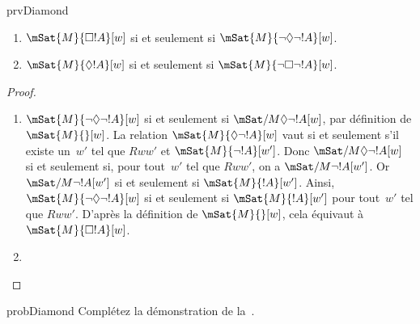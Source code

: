 \documentclass[../../../include/open-logic-section]{subfiles}
\begin{document}
\begin{tagblock}{prvDiamond}
\begin{prop}
  \begin{enumerate}
  \item $\mSat{M}{\Box !A}[w]$ si et seulement si
    $\mSat{M}{\lnot\Diamond\lnot !A}[w]$.
  \item $\mSat{M}{\Diamond !A}[w]$ si et seulement si
    $\mSat{M}{\lnot\Box\lnot !A}[w]$.
  \end{enumerate}
\end{prop}

\begin{proof}
  \begin{enumerate}
    \item $\mSat{M}{\lnot\Diamond\lnot !A}[w]$ si et seulement si
      $\mSat/{M}{\Diamond\lnot !A}[w]$, par définition de
      $\mSat{M}{}[w]$. La relation
      $\mSat{M}{\Diamond\lnot !A}[w]$ vaut si et seulement s'il
      existe un~$w'$ tel que $Rww'$ et
      $\mSat{M}{\lnot !A}[w']$. Donc
      $\mSat/{M}{\Diamond\lnot !A}[w]$ si et seulement si, pour
      tout~$w'$ tel que $Rww'$, on a
      $\mSat/{M}{\lnot !A}[w']$. Or
      $\mSat/{M}{\lnot !A}[w']$ si et seulement si
      $\mSat{M}{!A}[w']$. Ainsi,
      $\mSat{M}{\lnot\Diamond\lnot !A}[w]$ si et seulement si
      $\mSat{M}{!A}[w']$ pour tout~$w'$ tel que $Rww'$.
      D'après la définition de $\mSat{M}{}[w]$, cela équivaut à
      $\mSat{M}{\Box !A}[w]$.
    \item {}
  \end{enumerate}
\end{proof}

\begin{probtag}{probDiamond}
  Complétez la démonstration de la~.
\end{probtag}
\end{tagblock}
\end{document}
